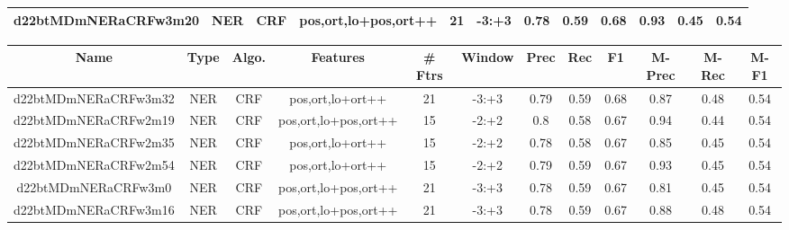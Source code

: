 \documentclass[a4paper]{article}
\begin{document}
\begin{landscape}
\begin{center}
\begin{tabular}{ |c|c|c|c|c|c|c|c|c|c|c|c|}
 	
 
 	
 		
 		\small{ d22btMDmNERaCRFw3m20 } & NER & CRF & pos,ort,lo+pos,ort++  &  21 &  -3:+3  &  0.78 & 0.59 & 0.68  &  0.93 & 0.45 & 0.54 \\
 		
 \hline
\end{tabular}
\end{center}




\begin{center}
\begin{tabular}{ |c|c|c|c|c|c|c|c|c|c|c|c|} 
 \hline
 	Name & Type & Algo. & Features & \# Ftrs & Window & Prec & Rec & F1 & M-Prec & M-Rec & M-F1\\
 \hline

 		

 	
 
 	
 		
 		\small{ d22btMDmNERaCRFw3m32 } & NER & CRF & pos,ort,lo+ort++  &  21 &  -3:+3  &  0.79 & 0.59 & 0.68  &  0.87 & 0.48 & 0.54 \\
 		

 	
 
 	
 		
 		\small{ d22btMDmNERaCRFw2m19 } & NER & CRF & pos,ort,lo+pos,ort++  &  15 &  -2:+2  &  0.8 & 0.58 & 0.67  &  0.94 & 0.44 & 0.54 \\
 		

 	
 
 	
 		
 		\small{ d22btMDmNERaCRFw2m35 } & NER & CRF & pos,ort,lo+ort++  &  15 &  -2:+2  &  0.78 & 0.58 & 0.67  &  0.85 & 0.45 & 0.54 \\
 		

 	
 
 	
 		
 		\small{ d22btMDmNERaCRFw2m54 } & NER & CRF & pos,ort,lo+ort++  &  15 &  -2:+2  &  0.79 & 0.59 & 0.67  &  0.93 & 0.45 & 0.54 \\
 		

 	
 
 	
 		
 		\small{ d22btMDmNERaCRFw3m0 } & NER & CRF & pos,ort,lo+pos,ort++  &  21 &  -3:+3  &  0.78 & 0.59 & 0.67  &  0.81 & 0.45 & 0.54 \\
 		

 	
 
 	
 		
 		\small{ d22btMDmNERaCRFw3m16 } & NER & CRF & pos,ort,lo+pos,ort++  &  21 &  -3:+3  &  0.78 & 0.59 & 0.67  &  0.88 & 0.48 & 0.54 \\
 		


\end{tabular}
\end{center}
\end{landscape}
\end{document}
